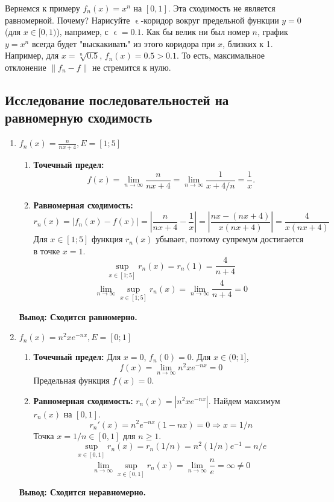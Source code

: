 \documentclass[a4paper, 12pt]{report}
\numberwithin{equation}{section}
\renewcommand{\varepsilon}{\upvarepsilon}
\begin{document}
	Вернемся к примеру $f_n(x) = x^n$ на $[0,1]$. Эта сходимость не является равномерной. Почему? Нарисуйте $\varepsilon$-коридор вокруг предельной функции $y=0$ (для $x \in [0,1)$), например, с $\varepsilon = 0.1$. Как бы велик ни был номер $n$, график $y=x^n$ всегда будет "выскакивать" из этого коридора при $x$, близких к 1. Например, для $x = \sqrt[n]{0.5}$, $f_n(x) = 0.5 > 0.1$. То есть, максимальное отклонение $\|f_n - f\|$ не стремится к нулю.

	
	\subsection{Исследование последовательностей на равномерную сходимость}
	
	\begin{enumerate}
		\item $f_n(x) = \frac{n}{nx + 4}, E = [1;5]$
		\begin{enumerate}
			\item \textbf{Точечный предел:} $$f(x) = \lim_{n \to \infty} \frac{n}{nx + 4} = \lim_{n \to \infty} \frac{1}{x + 4/n} = \frac{1}{x}.$$
			\item \textbf{Равномерная сходимость:}
			$$r_n(x) = |f_n(x) - f(x)| = \left|\frac{n}{nx + 4} - \frac{1}{x}\right| = \left|\frac{nx - (nx+4)}{x(nx+4)}\right| = \frac{4}{x(nx+4)}$$
			Для $x \in [1;5]$ функция $r_n(x)$ убывает, поэтому супремум достигается в точке $x=1$.
			$$\sup_{x \in [1;5]} r_n(x) = r_n(1) = \frac{4}{n+4}$$
			$$\lim_{n \to \infty} \sup_{x \in [1;5]} r_n(x) = \lim_{n \to \infty} \frac{4}{n+4} = 0$$
		\end{enumerate}
		\textbf{Вывод: Сходится равномерно.}
		
		\item $f_n(x) = n^2xe^{-nx}, E = [0;1]$
		\begin{enumerate}
			\item \textbf{Точечный предел:} Для $x=0$, $f_n(0)=0$. Для $x \in (0;1]$, $$f(x) = \lim_{n \to \infty} n^2xe^{-nx} = 0$$ Предельная функция $f(x)=0$.
			\item \textbf{Равномерная сходимость:}
			$r_n(x) = |n^2xe^{-nx}|$. Найдем максимум $r_n(x)$ на $[0,1]$.
			$$r_n'(x) = n^2e^{-nx}(1-nx) = 0 \Rightarrow x=1/n$$ Точка $x=1/n \in [0,1]$ для $n \ge 1$.
			$$\sup_{x \in [0,1]} r_n(x) = r_n(1/n) = n^2(1/n)e^{-1} = n/e$$
			$$\lim_{n \to \infty} \sup_{x \in [0,1]} r_n(x) = \lim_{n \to \infty} \frac{n}{e} = \infty \neq 0$$
		\end{enumerate}
		\textbf{Вывод: Сходится неравномерно.}
		

\end{enumerate}
\end{document}
